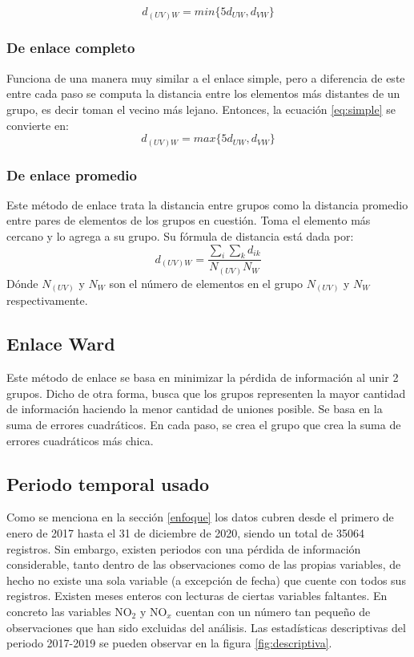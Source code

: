 \documentclass[journal, 10pt]{IEEEtran}                                                          %
\begin{document}
\begin{equation}\label{eq:simple}
d_{(U V)W} = min\{5d_{UW}, d_{VW}\}
\end{equation}
\cite{appliedMulti}

\subsubsection{De enlace completo}\label{complete}
Funciona de una manera muy similar a el enlace simple, pero a diferencia de este entre cada paso se computa la distancia entre los elementos más distantes de un grupo, es decir toman el vecino más lejano. Entonces, la ecuación \ref{eq:simple} se convierte en:
\begin{equation}\label{eq:comlete}
d_{(U V)W} = max\{5d_{UW}, d_{VW}\}
\end{equation}
\cite{appliedMulti}


\subsubsection{De enlace promedio}\label{avg}
Este método de enlace trata la distancia entre grupos como la distancia promedio entre pares de elementos de los grupos en cuestión. Toma el elemento más cercano y lo agrega a su grupo. Su fórmula de distancia está dada por:
\begin{equation}\label{eq:avg}
    d_{(U V)W}=\frac{\sum_{i}\sum_{k}d_{ik}}{N_{(UV)}N_W}
\end{equation}
Dónde $N_{(UV)}$ y $N_W$ son el número de elementos en el grupo $N_{(UV)}$ y $N_W$ respectivamente\cite{appliedMulti}.

\subsection{Enlace Ward}\label{ward}
Este método de enlace se basa en minimizar la pérdida de información al unir 2 grupos. Dicho de otra forma, busca que los grupos representen la mayor cantidad de información haciendo la menor cantidad de uniones posible. Se basa en la suma de errores cuadráticos. En cada paso, se crea el grupo que crea la suma de errores cuadráticos más chica\cite{appliedMulti}. 

\subsection{Periodo temporal usado}

Como se menciona en la sección \ref{enfoque} los datos cubren desde el primero de enero de 2017 hasta el 31 de diciembre de 2020, siendo un total de 35064 registros. Sin embargo, existen periodos con una pérdida de información considerable, tanto dentro de las observaciones como de las propias variables, de hecho no existe una sola variable (a excepción de fecha) que cuente con todos sus registros. Existen meses enteros con lecturas de ciertas variables faltantes. En concreto las variables NO${_2}$ y NO${_x}$ cuentan con un número tan pequeño de observaciones que han sido excluidas del análisis. Las estadísticas descriptivas del periodo 2017-2019 se pueden observar en la figura \ref{fig:descriptiva}. 
\end{document}
